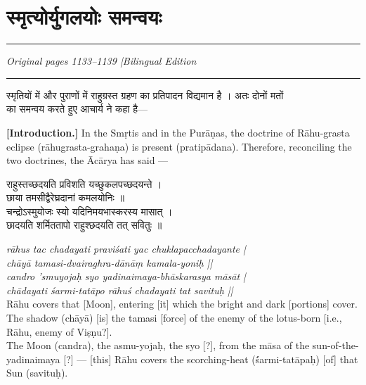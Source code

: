 \documentclass[11pt,a4paper]{article}
\newcommand{\dev}[1]{{\devanagarifont #1}}
\newcommand{\bilingualpair}[2]{%
  \noindent%
  \begin{minipage}[t]{0.48\textwidth}
    #1%
  \end{minipage}%
  \hfill%
  \begin{minipage}[t]{0.48\textwidth}
    #2%
  \end{minipage}%
  \par\vspace{0.5em}%
}
\newenvironment{sanskritcol}{\devanagarifont\small}{}
\newenvironment{englishcol}{\iastfont\small}{}
\begin{document}
\newpage

\section*{\dev{स्मृत्योर्युगलयोः समन्वयः}}

\noindent\rule{\textwidth}{0.6pt}
\begin{center}
\textit{Original pages 1133--1139 \quad|\quad Bilingual Edition}
\end{center}
\noindent\rule{\textwidth}{0.6pt}
\vspace{0.5cm}

\bilingualpair{%
\begin{sanskritcol}
\dev{स्मृतियों में और पुराणों में राहुग्रस्त ग्रहण का प्रतिपादन विद्यमान है । अतः दोनों मतों}\\[0.3em]
\dev{का समन्वय करते हुए आचार्य ने कहा है---}
\end{sanskritcol}%
}{%
\begin{englishcol}
\textbf{[Introduction.]} In the Smṛtis and in the Purāṇas, the doctrine of Rāhu-grasta eclipse (rāhugrasta-grahaṇa) is present (pratipādana). Therefore, reconciling the two doctrines, the Ācārya has said ---
\end{englishcol}%
}

\vspace{0.3cm}
\bilingualpair{%
\begin{sanskritcol}
\dev{राहुस्तच्छदयति प्रविशति यच्छुकलपच्छदयन्ते ।}\\[0.3em]
\dev{छाया तमसीद्वैरेघ्रदानां कमलयोनिः ॥}\\[0.5em]
\dev{चन्द्रोऽस्मुयोजः स्यो यदिनिमयभास्करस्य मासात् ।}\\[0.3em]
\dev{छादयति शर्मिततापो राहुश्छदयति तत् सवितुः ॥}
\end{sanskritcol}%
}{%
\begin{englishcol}
\textit{rāhus tac chadayati praviśati yac chuklapacchadayante |}\\[0.3em]
\textit{chāyā tamasi-dvairaghra-dānāṃ kamala-yoniḥ ||}\\[0.3em]
\textit{candro 'smuyojaḥ syo yadinaimaya-bhāskarasya māsāt |}\\[0.3em]
\textit{chādayati śarmi-tatāpo rāhuś chadayati tat savituḥ ||}\\[0.3em]
Rāhu covers that [Moon], entering [it] which the bright and dark [portions] cover. The shadow (chāyā) [is] the tamasi [force] of the enemy of the lotus-\-born [i.e., Rāhu, enemy of Viṣṇu?].\\[0.3em]
The Moon (candra), the asmu-yojaḥ, the syo [?], from the māsa of the sun-\-of-\-the-\-yadinaimaya [?] --- [this] Rāhu covers the scorching-\-heat (\'śarmi-tatāpaḥ) [of] that Sun (savituḥ).
\end{englishcol}%
}
\end{document}
